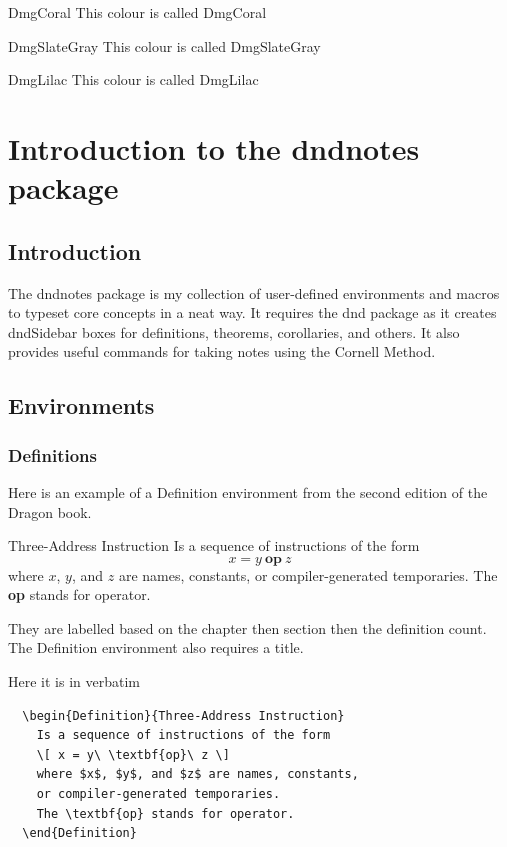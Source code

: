 \documentclass[letterpaper,10pt,twoside,twocolumn,openany]{book}
\begin{document}
\begin{DndSidebar}[color=DmgCoral]{DmgCoral}
  This colour is called DmgCoral
\end{DndSidebar}

\begin{DndSidebar}[color=DmgSlateGray]{DmgSlateGray}
  This colour is called DmgSlateGray
\end{DndSidebar}

\begin{DndSidebar}[color=DmgLilac]{DmgLilac}
  This colour is called DmgLilac
\end{DndSidebar}
\onecolumn
\part{Introduction to the dndnotes package}
\chapter{Introduction}
The dndnotes package is my collection of user-defined environments and macros to typeset core concepts in a neat way. It requires the dnd package as it creates dndSidebar boxes for definitions, theorems, corollaries, and others. 
It also provides useful commands for taking notes using the Cornell Method.

\chapter{Environments}

\section{Definitions}
Here is an example of a Definition environment from the second edition of the Dragon book.
\begin{Definition}{Three-Address Instruction}
  Is a sequence of instructions of the form 
  \[ x = y\ \textbf{op}\ z \] 
  where $x$, $y$, and $z$ are names, constants, or compiler-generated temporaries. 
  The \textbf{op} stands for operator. 
\end{Definition}
They are labelled based on the chapter then section then the definition count.
The Definition environment also requires a title.

Here it is in verbatim
\begin{verbatim}
  \begin{Definition}{Three-Address Instruction}
    Is a sequence of instructions of the form 
    \[ x = y\ \textbf{op}\ z \] 
    where $x$, $y$, and $z$ are names, constants,
    or compiler-generated temporaries. 
    The \textbf{op} stands for operator. 
  \end{Definition}
\end{verbatim}
\end{document}
